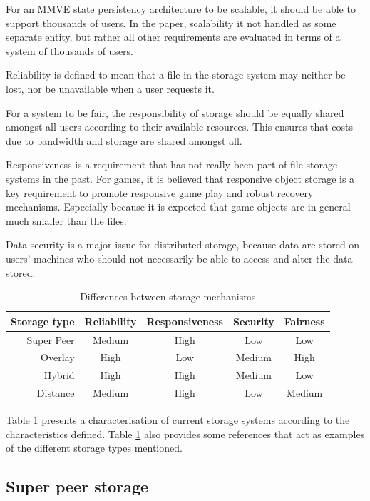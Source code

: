 \documentclass[10pt,a4paper,conference]{IEEEtran}
\begin{document}
For an MMVE state persistency architecture to be scalable, it should be able to support thousands of users. In the paper, scalability it not handled
as some separate entity, but rather all other requirements are evaluated in terms of a system of thousands of users.

Reliability is defined to mean that a file in the storage system may neither be lost, nor be unavailable when a user requests it.

For a system to be fair, the responsibility of storage should be equally shared amongst all users according to their available resources. This
ensures that costs due to bandwidth and storage are shared amongst all.

Responsiveness is a requirement that has not really been part of file storage systems in the past. For games, it is believed that responsive object
storage is a key requirement to promote responsive game play and robust recovery mechanisms. Especially because it is expected that game objects are
in general much smaller than the files.

Data security is a major issue for distributed storage, because data are stored on users' machines who should not necessarily be able to access and
alter the data stored.

\begin{table}[htbp]
\centering
\begin{tabular}{|r|c|c|c|c|}
\hline
Storage type & Reliability & Responsiveness & Security & Fairness\\
\hline
Super Peer & Medium & High & Low & Low\\
Overlay & High & Low & Medium & High\\
Hybrid & High & High & Medium & Low\\
Distance & Medium & High & Low & Medium\\
\hline
\end{tabular}
\caption{Differences between storage mechanisms} \label{tab_storage}
\end{table}
%
Table \ref{tab_storage} presents a characterisation of current storage systems according to the characteristics defined. Table \ref{tab_storage} also
provides some references that act as examples of the different storage types mentioned.

\subsection{Super peer storage}
\end{document}
